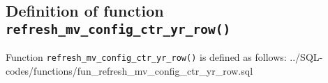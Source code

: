 \subsection{Definition of function \texttt{refresh\_mv\_config\_ctr\_yr\_row()}}\label{subsec_appx_fun_refresh_mv_config_ctr_yr_row}

Function \texttt{refresh\_mv\_config\_ctr\_yr\_row()} is defined as follows:
%
{../SQL-codes/functions/fun_refresh_mv_config_ctr_yr_row.sql}
